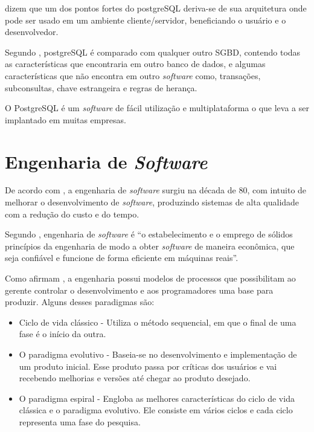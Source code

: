 	\par {}  dizem que um dos pontos fortes do
postgreSQL deriva-se de sua arquitetura onde pode ser usado em um ambiente
cliente/servidor, beneficiando o usuário e o desenvolvedor.

	\par Segundo , postgreSQL é comparado com
qualquer outro SGBD, contendo todas as características que encontraria em outro
banco de dados, e algumas características que não encontra em outro
\textit{software} como, transações, subconsultas, chave estrangeira e regras de
herança.

	\par O PostgreSQL é um \textit{software} de fácil utilização e multiplataforma
o que leva a ser implantado em muitas empresas.


\section{Engenharia de \textit{Software}}

	\par De acordo com , a engenharia de \textit{software}
surgiu na década de 80, com intuito de melhorar o desenvolvimento de
\textit{software}, produzindo sistemas de alta qualidade com a redução do custo
e do tempo.

	\par Segundo , engenharia de \textit{software} é
“o estabelecimento e o emprego de sólidos princípios da engenharia de modo a
obter \textit{software} de maneira econômica, que seja confiável e funcione de
forma eficiente em máquinas reais”.

	\par Como afirmam , a engenharia possui modelos de
processos que possibilitam ao gerente controlar o desenvolvimento e aos
programadores uma base para produzir. Alguns desses paradigmas são:

	\begin{itemize}
	  
	  \item Ciclo de vida clássico - Utiliza o método sequencial, em que o final
	  de uma fase é o início da outra.
	  
	  \item O paradigma evolutivo - Baseia-se no desenvolvimento e implementação
	  de um produto inicial. Esse produto passa por críticas dos usuários e vai
	  recebendo melhorias e versões até chegar ao produto desejado.
	  
	  \item O paradigma espiral - Engloba as melhores características do ciclo de
	  vida clássica e o paradigma evolutivo. Ele consiste em vários ciclos e cada
	  ciclo representa uma fase do pesquisa.
	
	\end{itemize}




